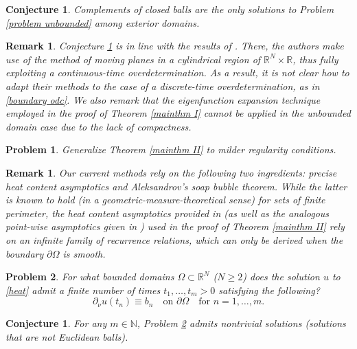 \documentclass[a4paper,11pt]{article}
\newtheorem{remark}[theorem]{Remark}
\newtheorem{problem}{Problem}
\newtheorem{conjecture}[theorem]{Conjecture}
\numberwithin{equation}{section}
\begin{document}
\begin{conjecture}\label{conjecture exterior}
Complements of closed balls are the only solutions to Problem \ref{problem unbounded} among \emph{exterior domains}.      
\end{conjecture}

\begin{remark}
Conjecture \ref{conjecture exterior} is in line with the results of \cite{MR1860493}. There, the authors make use of the method of moving planes in a cylindrical region of $\mathbb{R}^N\times\mathbb{R}$, thus fully exploiting a continuous-time overdetermination. As a result, it is not clear how to adapt their methods to the case of a discrete-time overdetermination, as in \eqref{boundary odc}. We also remark that the eigenfunction expansion technique employed in the proof of Theorem \ref{mainthm I} cannot be applied in the unbounded domain case due to the lack of compactness.
\end{remark}

\begin{problem}
Generalize Theorem \ref{mainthm II} to milder regularity conditions.   
\end{problem}
\begin{remark}
Our current methods rely on the following two ingredients: precise heat content asymptotics and Aleksandrov's soap bubble theorem. While the latter is known to hold (in a geometric-measure-theoretical sense) for sets of finite perimeter, the heat content asymptotics provided in \cite{gilkey2003asymptotic} (as well as the analogous point-wise asymptotics given in \cite{savo2016heat}) 
used in the proof of Theorem \ref{mainthm II} rely on an infinite family of recurrence relations, which can only be derived when the boundary $\partial\Omega$ is smooth.
\end{remark}

\begin{problem}\label{problem finite times}
 For what bounded domains $\Omega\subset\mathbb{R}^N$ ($N\ge 2$) does the solution $u$ to \eqref{heat} admit \emph{a finite number} of times $t_1,\dots,t_m>0$ satisfying the following? 
 \begin{equation*}
     \partial_\nu u(t_n)\equiv b_n \quad \text{on }\partial\Omega\quad \text{for }n=1,\dots, m.
 \end{equation*}
\end{problem}

\begin{conjecture}
For any $m\in\mathbb{N}$, Problem \ref{problem finite times} admits nontrivial solutions (solutions that are not Euclidean balls). 
\end{conjecture}
\end{document}
